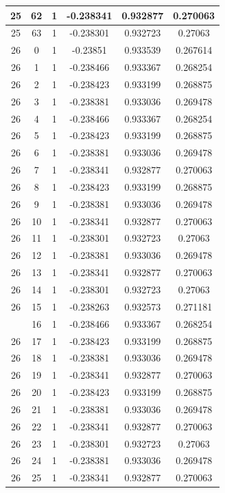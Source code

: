 \documentclass[12pt,a4paper]{article}
\numberwithin{equation}{section}
\numberwithin{figure}{section}
\numberwithin{table}{section}
\begin{document}
\begin{longtable}{|c|c|c|c|c|c|}
25 & 62 & 1 & -0.238341 & 0.932877 & 0.270063 \\ \hline
25 & 63 & 1 & -0.238301 & 0.932723 & 0.27063 \\ \hline
26 & 0 & 1 & -0.23851 & 0.933539 & 0.267614 \\ \hline
26 & 1 & 1 & -0.238466 & 0.933367 & 0.268254 \\ \hline
26 & 2 & 1 & -0.238423 & 0.933199 & 0.268875 \\ \hline
26 & 3 & 1 & -0.238381 & 0.933036 & 0.269478 \\ \hline
26 & 4 & 1 & -0.238466 & 0.933367 & 0.268254 \\ \hline
26 & 5 & 1 & -0.238423 & 0.933199 & 0.268875 \\ \hline
26 & 6 & 1 & -0.238381 & 0.933036 & 0.269478 \\ \hline
26 & 7 & 1 & -0.238341 & 0.932877 & 0.270063 \\ \hline
26 & 8 & 1 & -0.238423 & 0.933199 & 0.268875 \\ \hline
26 & 9 & 1 & -0.238381 & 0.933036 & 0.269478 \\ \hline
26 & 10 & 1 & -0.238341 & 0.932877 & 0.270063 \\ \hline
26 & 11 & 1 & -0.238301 & 0.932723 & 0.27063 \\ \hline
26 & 12 & 1 & -0.238381 & 0.933036 & 0.269478 \\ \hline
26 & 13 & 1 & -0.238341 & 0.932877 & 0.270063 \\ \hline
26 & 14 & 1 & -0.238301 & 0.932723 & 0.27063 \\ \hline
26 & 15 & 1 & -0.238263 & 0.932573 & 0.271181 \\ \hline
\pagebreak
26 & 16 & 1 & -0.238466 & 0.933367 & 0.268254 \\ \hline
26 & 17 & 1 & -0.238423 & 0.933199 & 0.268875 \\ \hline
26 & 18 & 1 & -0.238381 & 0.933036 & 0.269478 \\ \hline
26 & 19 & 1 & -0.238341 & 0.932877 & 0.270063 \\ \hline
26 & 20 & 1 & -0.238423 & 0.933199 & 0.268875 \\ \hline
26 & 21 & 1 & -0.238381 & 0.933036 & 0.269478 \\ \hline
26 & 22 & 1 & -0.238341 & 0.932877 & 0.270063 \\ \hline
26 & 23 & 1 & -0.238301 & 0.932723 & 0.27063 \\ \hline
26 & 24 & 1 & -0.238381 & 0.933036 & 0.269478 \\ \hline
26 & 25 & 1 & -0.238341 & 0.932877 & 0.270063 \\ \hline

\end{longtable}
\end{document}
